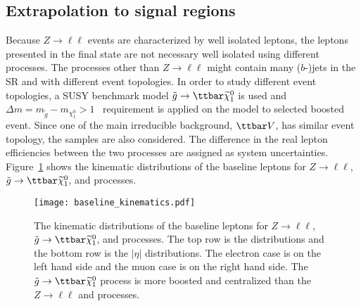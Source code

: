 
\subsection{Extrapolation to signal regions}
\label{subsec:app_RLE_extrapolation_to_signal_region}
Because $Z\to \ell\ell$ events are characterized by well isolated leptons, the leptons presented in the final state are not necessary well isolated using different processes.
The processes other than $Z\to \ell\ell$ might contain many ($b$-)jets in the SR and with different event topologies.
In order to study different event topologies, a SUSY benchmark model $\tilde{g}\to\ttbar \widetilde{\chi}^{0}_{1}$ is used and $\Delta m = m_{\tilde{g}} - m_{\chi^{0}_{1}} > 1$~{\TeV} requirement is applied on the model to selected boosted event.
Since one of the main irreducible background, $\ttbar V$, has similar event topology, the \ttbar samples are also considered.
The difference in the real lepton efficiencies between the two processes are assigned as system uncertainties.
Figure~\ref{fig:app_RLE_kinematic} shows the kinematic distributions of the baseline leptons for $Z\to \ell\ell$, $\tilde{g} \to \ttbar \widetilde{\chi}^{0}_{1}$, and \ttbar processes.

\begin{figure}[htb]
    \texttt{[image: baseline\_kinematics.pdf]}
    \caption{The kinematic distributions of the baseline leptons for $Z\to \ell\ell$, $\tilde{g} \to \ttbar \widetilde{\chi}^{0}_{1}$, and \ttbar processes.
    The top row is the \pt distributions and the bottom row is the $|\eta|$ distributions.
    The electron case is on the left hand side and the muon case is on the right hand side.
    The $\tilde{g} \to \ttbar \widetilde{\chi}^{0}_{1}$ process is more boosted and centralized than the $Z\to \ell \ell$ and \ttbar processes.}
    \label{fig:app_RLE_kinematic}
\end{figure}

